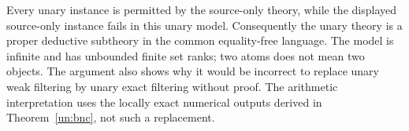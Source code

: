 Every unary instance is permitted by the source-only theory, while the
displayed source-only instance fails in this unary model. Consequently
the unary theory is a proper deductive subtheory in the common
equality-free language. The model is infinite and has unbounded finite
set ranks; two atoms does not mean two objects. The argument also shows
why it would be incorrect to replace unary weak filtering by unary
exact filtering without proof. The arithmetic interpretation uses the
locally exact numerical outputs derived in Theorem~\ref{un:bnc}, not
such a replacement.

